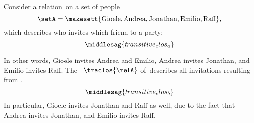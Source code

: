 \begin{example}
    \label{exa:party}
    Consider a relation~\relA on a set of people
    \begin{equation}
        \setA=\makesett{\text{Gioele}, \text{Andrea}, \text{Jonathan}, \text{Emilio}, \text{Raff}},
    \end{equation}
    which describes who invites which friend to a party:
    \begin{equation}
        \label{eq:transitive_clos_a}
        \middlesag{transitive_clos_a}
    \end{equation}

    In other words, Gioele invites Andrea and Emilio, Andrea invites Jonathan, and Emilio invites Raff.
    The ~$\traclos{\relA}$ of~\relA describes all invitations resulting from .
    \begin{equation}
        \label{eq:transitive_clos_b}
        \middlesag{transitive_clos_b}
    \end{equation}
    In particular, Gioele invites Jonathan and Raff as well, due to the fact that Andrea invites Jonathan, and Emilio invites Raff.
\end{example}



